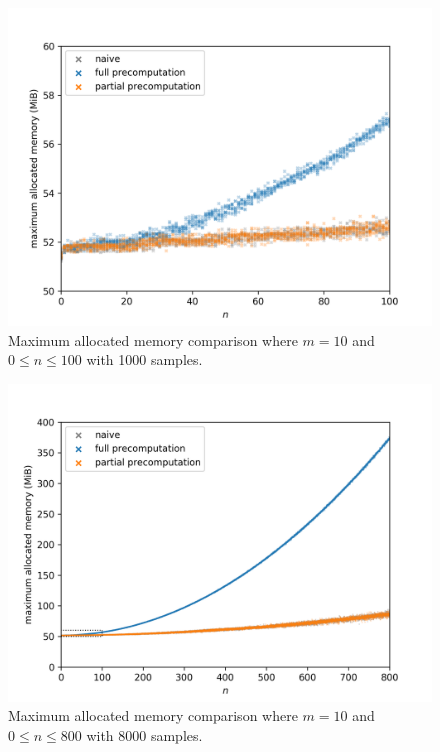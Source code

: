 \begin{figure}[H]
	\centering
	\includegraphics[scale=0.7]{figures/precomputation_memory_small}
	\caption{Maximum allocated memory comparison where $m=10$ and $0\leq n\leq 100$ with 1000 samples.}
\end{figure}

\begin{figure}[H]
	\centering
	\includegraphics[scale=0.7]{figures/precomputation_memory_big}
	\caption{Maximum allocated memory comparison where $m=10$ and $0\leq n\leq 800$ with 8000 samples.}
\end{figure}